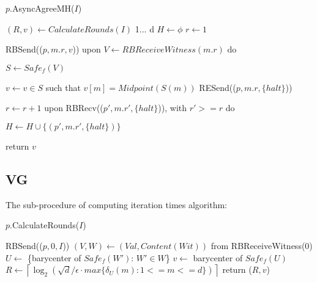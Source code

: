 \begin{algorithm}
\caption{$p$.AsyncAgreeMH($I$)}
\begin{algorithmic}

    \State $(R, v) \leftarrow CalculateRounds(I)$
     {1}... {d}
        \State $H \leftarrow \phi$
        \State $r \leftarrow 1$

        \State RBSend(($p, m.r, v$))
        \State upon $V \leftarrow RBReceiveWitness(m.r)$ do

        \State \hspace{0.8cm} $S \leftarrow Safe_{f}(V)$

        \State \hspace{0.65cm} $v \leftarrow v \in S$ such that $v[m] = Midpoint(S(m))$
        \hspace{1cm} 
        \hspace{1cm} \State RESend(($p, m.r, \{halt\}$))
        \hspace{1cm} \EndIf

        \hspace{0.8cm} $r \leftarrow r + 1$
        \State upon RBRecv(($p\prime, m.r\prime, \{halt\}$)), with $r\prime >= r$ do

        \hspace{1cm} $H \leftarrow H \cup \{(p\prime, m.r\prime, \{halt\})\}$
        \EndWhile
    \EndFor

    \State return $v$
\end{algorithmic}
\end{algorithm}


\subsection{VG}

The sub-procedure of computing iteration times algorithm:

\begin{algorithm}
\caption{$p$.CalculateRounds($I$)}
\begin{algorithmic}
    \State RBSend(($p, 0, I$))
    \State $(V, W) \leftarrow (Val, Content(Wit))$ from RBReceiveWitness(0)
    \State $U \leftarrow$ \{barycenter of $Safe_{f}({W\prime})$: $W\prime \in W$\}
    \State $v \leftarrow$ barycenter of $Safe_{f}(U)$
    \State $R \leftarrow \left\lceil \log_2(\sqrt{d}/\epsilon \cdot max\{\delta_{U}(m):1 <= m <= d\})  \right\rceil$
    \State return ($R, v$)
\end{algorithmic}
\end{algorithm}

